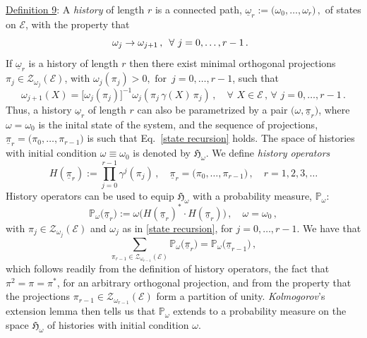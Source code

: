\documentclass[a4paper,11pt]{article}
\begin{document}
{\underline{Definition 9}: A \textit{history} of length $r$ is a connected path, 
$\underline{\omega}_{r}:= \big(\omega_0, \dots, \omega_{r}\big)\,,$ of states on $\mathcal{E}$, with the property that
\begin{equation}\label{history}
\hspace{3.5cm} \omega_j \rightarrow \omega_{j+1}\,, \, \, \,\forall \,\,j=0, \dots, r-1\,.\hspace{3.7cm} \square
\end{equation}
If $\underline{\omega}_{r}$ is a history of length $r$ then there exist minimal orthogonal projections $\pi_j \in \mathcal{Z}_{\omega_j}(\mathcal{E})$, with $\omega_{j}(\pi_j)>0, \text{ for }\, j=0, \dots, r-1$,  such that 
\begin{equation}\label{state recursion}
 \omega_{j+1}(X)= \big[\omega_{j}(\pi_j)\big]^{-1} \omega_{j}(\pi_j \, \gamma(X)\, \pi_j)\,, \quad\forall\,\, X\in \mathcal{E}\,,\,\forall\,\,j=0,\dots, r-1\,.
\end{equation}
Thus, a history $\underline{\omega}_r$ of length $r$ can also be parametrized by a pair 
$\big(\omega, \underline{\pi}_r \big)$, where $\omega=\omega_0$ is the inital state of the system, and the sequence 
of projections, $\underline{\pi}_r =\big(\pi_0, \dots, \pi_{r-1}\big)$ is such that Eq.~\eqref{state recursion} holds. The 
space of histories with initial condition $\omega\equiv \omega_0$ is denoted by $\mathfrak{H}_{\omega}$.
We define \textit{history operators}
\begin{equation}
H(\underline{\pi}_r):= \prod_{j=0}^{r-1}\gamma^{j}(\pi_j)\,, \quad \underline{\pi}_r =\big(\pi_0, \dots, \pi_{r-1}\big)\,,\quad r=1,2,3,\dots
\end{equation}
History operators can be used to equip $\mathfrak{H}_{\omega}$ with a probability measure, $\mathbb{P}_{\omega}$:
\begin{equation}\label{prob of history}
\mathbb{P}_{\omega}\big(\underline{\pi}_r\big):= \omega\big( H(\underline{\pi}_r)^{*}\cdot H(\underline{\pi}_r)\big)\,,\quad \omega =\omega_{0} \,,
\end{equation}
with $\pi_{j} \in \mathcal{Z}_{\omega_j}(\mathcal{E})$ and $\omega_j$ as in \eqref{state recursion}, for $j=0, \dots, r-1$. 
We have that
$$\sum_{\pi_{r-1} \in \mathcal{Z}_{\omega_{r-1}}(\mathcal{E})} \mathbb{P}_{\omega}\big(\underline{\pi}_r\big) = 
\mathbb{P}_{\omega}\big(\underline{\pi}_{r-1}\big)\,,$$
which follows readily from the definition of history operators, the fact that $\pi^{2}=\pi= \pi^{*}$, for an arbitrary orthogonal projection, and from the property that the projections $\pi_{r-1}\in \mathcal{Z}_{\omega_{r-1}}(\mathcal{E})$ form a partition of unity. \textit{Kolmogorov}'s extension lemma then tells us that $\mathbb{P}_{\omega}$ extends to a probability measure on the space $\mathfrak{H}_{\omega}$ of histories with initial condition $\omega$. 

}
\end{document}
